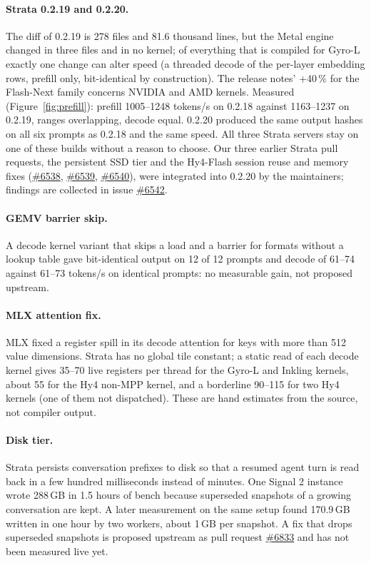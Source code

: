 \paragraph{Strata 0.2.19 and 0.2.20.} The diff of 0.2.19 is 278 files and 81.6 thousand lines, but the Metal engine
changed in three files and in no kernel; of everything that is compiled for Gyro-L exactly one change can alter speed
(a threaded decode of the per-layer embedding rows, prefill only, bit-identical by construction). The release notes' +40\,\%
for the Flash-Next family concerns NVIDIA and AMD kernels. Measured (Figure~\ref{fig:prefill}): prefill 1005--1248 tokens/s
on 0.2.18 against 1163--1237 on 0.2.19, ranges overlapping, decode equal. 0.2.20 produced the same output hashes on all six prompts
as 0.2.18 and the same speed. All three Strata servers stay on one of these builds without a reason to choose.
Our three earlier Strata pull requests, the persistent SSD tier and the Hy4-Flash session reuse and memory fixes (\href{https://github.com/Niko1221/Strata/pull/6538}{\#6538}, \href{https://github.com/Niko1221/Strata/pull/6539}{\#6539}, \href{https://github.com/Niko1221/Strata/pull/6540}{\#6540}), were integrated into 0.2.20 by the maintainers; findings are collected in issue \href{https://github.com/Niko1221/Strata/issues/6542}{\#6542}.

\paragraph{GEMV barrier skip.} A decode kernel variant that skips a load and a barrier for formats without a lookup
table gave bit-identical output on 12 of 12 prompts and decode of 61--74 against 61--73 tokens/s on identical prompts: no
measurable gain, not proposed upstream.

\paragraph{MLX attention fix.} MLX fixed a register spill in its decode attention for keys with more than 512 value
dimensions. Strata has no global tile constant; a static read of each decode kernel gives 35--70 live registers per
thread for the Gyro-L and Inkling kernels, about 55 for the Hy4 non-MPP kernel, and a borderline 90--115 for two
Hy4 kernels (one of them not dispatched). These are hand estimates from the source, not compiler output.

\paragraph{Disk tier.} Strata persists conversation prefixes to disk so that a resumed agent turn is read back in a few
hundred milliseconds instead of minutes. One Signal 2 instance wrote 288\,GB in 1.5 hours of bench because superseded
snapshots of a growing conversation are kept. A later measurement on the same setup found 170.9\,GB written in one hour by two workers, about 1\,GB per snapshot. A fix that drops superseded snapshots is proposed upstream as pull request \href{https://github.com/Niko1221/Strata/pull/6833}{\#6833} and has not been measured live yet.

